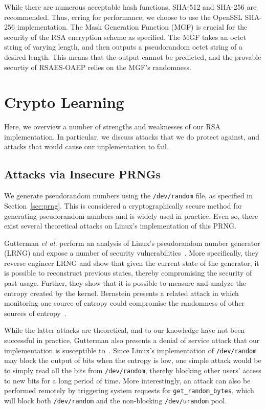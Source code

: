 \documentclass[a4paper]{article}
\begin{document}
While there are numerous acceptable hash functions, SHA-512 and SHA-256 are recommended.
Thus, erring for performance, we choose to use the OpenSSL SHA-256 implementation. The Mask Generation Function (MGF) is crucial for the security of the RSA encryption scheme as specified. 
The MGF takes an octet string of varying length, and then outputs a pseudorandom octet string of a desired length. This means that the output cannot be predicted, and the provable securtiy of RSAES-OAEP relies on the MGF's randomness.

\section{Crypto Learning}

Here, we overview a number of strengths and weaknesses of our RSA implementation. In particular, we discuss attacks that we do protect against, and attacks that would cause our implementation to fail.

\subsection{Attacks via Insecure PRNGs}

We generate pseudorandom numbers using the {\tt /dev/random} file, as specified in Section~\ref{sec:prng}. This is considered a cryptographically secure method for generating pseudorandom numbers and is widely used in practice. Even so, there exist several theoretical attacks on Linux's implementation of this PRNG.

Gutterman \emph{et al.} perform an analysis of Linux's pseudorandom number generator (LRNG) and expose a number of security vulnerabilities~\cite{gutterman2006analysis}. More specifically, they reverse engineer LRNG and show that given the current state of the generator, it is possible to reconstruct previous states, thereby compromising the security of past usage. Further, they show that it is possible to measure and analyze the entropy created by the kernel. Bernstein presents a related
attack in which monitoring one source of entropy could compromise the randomness of other sources of entropy~\cite{bernstein2014entropy}.

While the latter attacks are theoretical, and to our knowledge have not been successful in practice, Gutterman also presents a denial of service attack that our implementation is susceptible to~\cite{gutterman2006analysis}. Since Linux's implementation of {\tt /dev/random} may block the output of bits when the entropy is low, one simple attack would be to simply read all the bits from {\tt /dev/random}, thereby blocking other users' access to new bits for a long
period of time. More interestingly, an attack can also be performed remotely by triggering system requests for {\tt get\_random\_bytes}, which will block both {\tt /dev/random} and the non-blocking {\tt /dev/urandom} pool.
\end{document}
